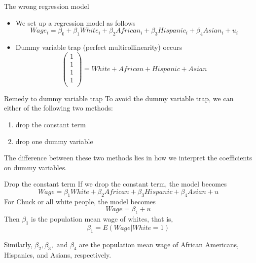 \documentclass[presentation,10pt]{beamer}
\begin{document}
\begin{frame}[label={sec:org28984c4}]{The wrong regression model}
\begin{itemize}
\item We set up a regression model as follows
\begin{equation}
\label{eq:dummy-trap}
Wage_i = \beta_0 + \beta_1 White_i + \beta_2 African_i + \beta_3 Hispanic_i + \beta_4 Asian_i + u_i
\end{equation}
\item Dummy variable trap (perfect multicollinearity) occurs
\begin{equation*}
\begin{pmatrix}
1 \\
1 \\
1 \\
1 \\
\end{pmatrix}
= White + African + Hispanic + Asian
\end{equation*}
\end{itemize}
\end{frame}

\begin{frame}[label={sec:orged65ff1}]{Remedy to dummy variable trap}
To avoid the dummy variable trap, we can either of the following two
methods:
\begin{enumerate}
\item drop the constant term
\item drop one dummy variable
\end{enumerate}
The difference between these two methods lies in how we interpret the
coefficients on dummy variables.
\end{frame}

\begin{frame}[label={sec:orge8981fd}]{Drop the constant term}
If we drop the constant term, the model becomes
\begin{equation}
\label{eq:dummy-trap-1}
Wage = \beta_1 White + \beta_2 African + \beta_3 Hispanic + \beta_4 Asian + u
\end{equation}
For Chuck or all white people, the model becomes
\[ Wage = \beta_1 + u \]
Then \(\beta_1\) is the population mean wage of whites, that is,
\[\beta_1 = E(Wage | White = 1)\]

Similarly, \(\beta_2, \beta_3, \text{ and } \beta_4\) are the population mean wage
of African Americans, Hispanics, and Asians, respectively.
\end{frame}
\end{document}
